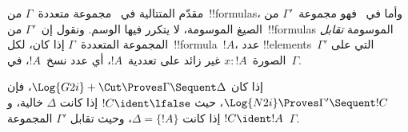 \documentclass[../../../include/open-logic-section]{subfiles}
\begin{document}


مقدّم المتتالية في~ مجموعة متعددة~$\Gamma$ من~!!{formula}s،
وأما في~ فهو مجموعة~$\Gamma'$ من الصيغ الموسومة، لا يتكرر فيها
الوسم. ونقول إن~$\Gamma'$ من~!!{formula}s الموسومة \emph{تقابل}
المجموعة المتعددة~$\Gamma$ إذا كان، لكل~!!{formula}~$!A$، عدد
!!{element}s~$\Gamma'$ التي على الصورة~$x : !A$ غير زائد على تعددية~$!A$،
أي عدد نسخ~$!A$، في~$\Gamma$.

\begin{prop}
إذا كان $\Log{G2i} + \Cut \Proves \Gamma \Sequent \Delta$، فإن $\Log{N2i}
\Proves \Gamma' \Sequent !C$، حيث $!C \ident \lfalse$ إذا كانت $\Delta$
خالية، و$!C \ident !A$ إذا كانت $\Delta = \{!A\}$، وحيث تقابل $\Gamma'$
المجموعة~$\Gamma$.
\end{prop}
\end{document}
